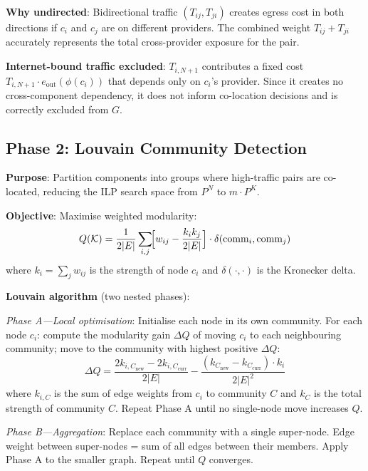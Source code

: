 \documentclass[10pt,journal]{IEEEtran}
\begin{document}
\textbf{Why undirected}:
Bidirectional traffic $(T_{ij}, T_{ji})$ creates egress cost in both directions
if $c_i$ and $c_j$ are on different providers.
The combined weight $T_{ij}+T_{ji}$ accurately represents the total cross-provider
exposure for the pair.

\textbf{Internet-bound traffic excluded}:
$T_{i,N+1}$ contributes a fixed cost $T_{i,N+1} \cdot e_{\text{out}}(\phi(c_i))$
that depends only on $c_i$'s provider.
Since it creates no cross-component dependency, it does not inform co-location
decisions and is correctly excluded from $G$.

\subsection{Phase 2: Louvain Community Detection}

\textbf{Purpose}: Partition components into groups where high-traffic pairs are
co-located, reducing the ILP search space from $P^N$ to $m \cdot P^K$.

\textbf{Objective}: Maximise weighted modularity:
\begin{equation}\label{eq:Q}
Q(\mathcal{K}) = \frac{1}{2|E|}\sum_{i,j}\!\Bigl[w_{ij} -
  \frac{k_i k_j}{2|E|}\Bigr] \cdot \delta(\text{comm}_i, \text{comm}_j)
\end{equation}
where $k_i = \sum_j w_{ij}$ is the strength of node $c_i$ and
$\delta(\cdot,\cdot)$ is the Kronecker delta.

\textbf{Louvain algorithm} (two nested phases):

\emph{Phase A---Local optimisation}: Initialise each node in its own community.
For each node $c_i$: compute the modularity gain $\Delta Q$ of moving $c_i$ to
each neighbouring community; move to the community with highest positive $\Delta Q$:
\begin{equation}\label{eq:deltaQ}
\Delta Q = \frac{2k_{i,C_{\text{new}}} - 2k_{i,C_{\text{curr}}}}{2|E|}
           - \frac{(k_{C_{\text{new}}} - k_{C_{\text{curr}}}) \cdot k_i}{2|E|^2}
\end{equation}
where $k_{i,C}$ is the sum of edge weights from $c_i$ to community $C$
and $k_C$ is the total strength of community $C$.
Repeat Phase A until no single-node move increases $Q$.

\emph{Phase B---Aggregation}: Replace each community with a single super-node.
Edge weight between super-nodes = sum of all edges between their members.
Apply Phase A to the smaller graph.
Repeat until $Q$ converges.
\end{document}
